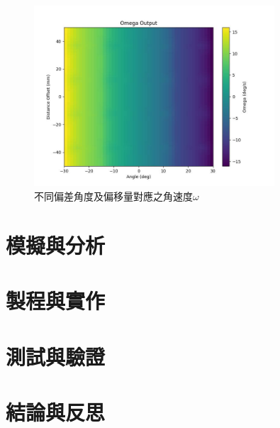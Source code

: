 \documentclass[12pt]{article}       %
\begin{document}
\begin{figure}[H]
    \centering
    \includegraphics[width=0.8\textwidth]{27.jpg}     %
    \caption{不同偏差角度及偏移量對應之角速度$\omega$}    %
    \label{fig:27}    %
\end{figure}

\section{\centering 模擬與分析}
\hspace{2em}


\section{\centering 製程與實作}
\hspace{2em}


\section{\centering 測試與驗證}
\hspace{2em}


\section{\centering 結論與反思}
\hspace{2em}
\end{document}
